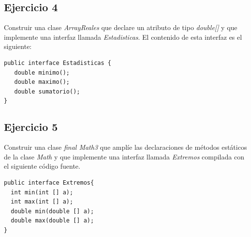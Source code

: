 \documentclass[4paper]{article}
\begin{document}
\subsection*{Ejercicio 4}
Construir una clase \emph{ArrayReales} que declare un atributo de tipo \emph{double[]} y que implemente una interfaz llamada \emph{Estadisticas}. El contenido de esta interfaz es el siguiente:
\begin{verbatim}
public interface Estadisticas {
   double minimo();
   double maximo();
   double sumatorio();
}
\end{verbatim}

\subsection*{Ejercicio 5}
Construir una clase \emph{final Math3} que amplíe las declaraciones de métodos estáticos de la clase \emph{Math} y que implemente una interfaz llamada \emph{Extremos} compilada con el siguiente código fuente.
\begin{verbatim}
public interface Extremos{
  int min(int [] a);
  int max(int [] a);
  double min(double [] a);
  double max(double [] a);
}
\end{verbatim}
\end{document}
